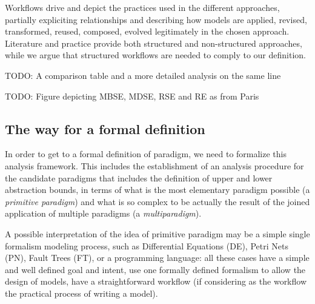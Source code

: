 Workflows drive and depict the practices used in the different approaches, partially expliciting relationships and describing how models are applied, revised, transformed, reused, composed, evolved legitimately in the chosen approach. Literature and practice provide both structured and non-structured approaches, while we argue that structured workflows are needed to comply to our definition.

TODO: A comparison table and a more detailed analysis on the same line

TODO: Figure depicting MBSE, MDSE, RSE and RE as from Paris

\subsection{The way for a formal definition}

In order to get to a formal definition of paradigm, we need to formalize this analysis framework. This includes the establishment of an analysis procedure for the candidate paradigms that includes the definition of upper and lower abstraction bounds, in terms of what is the most elementary paradigm possible (a \textit{primitive paradigm}) and what is so complex to be actually the result of the joined application of multiple paradigms (a \textit{multiparadigm}).

A possible interpretation of the idea of primitive paradigm may be a simple single formalism modeling process, such as Differential Equations (DE), Petri Nets (PN), Fault Trees (FT), or a programming language: all these cases have a simple and well defined goal and intent, use one formally defined formalism to allow the design of models, have a straightforward workflow (if considering as the workflow the practical process of writing a model).

